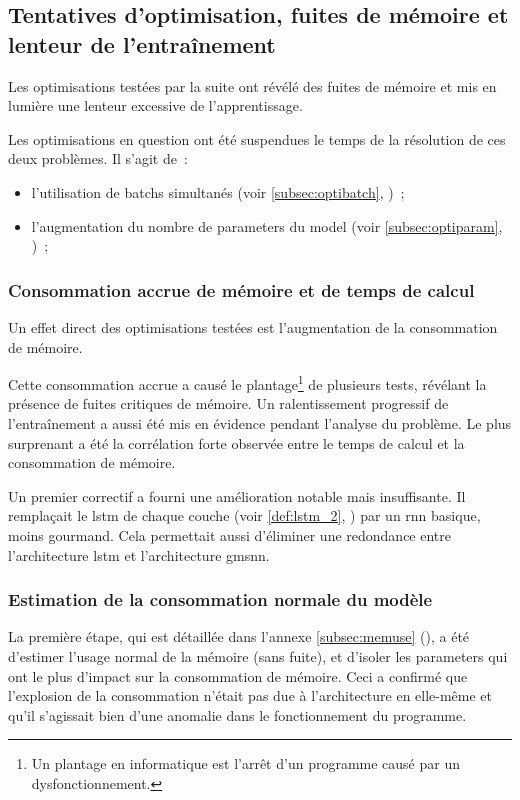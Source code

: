 \subsection{Tentatives d'optimisation, fuites de mémoire et lenteur de l'entraînement}\label{subsec:optimem}

Les optimisations testées par la suite ont révélé des fuites de mémoire et mis en lumière une lenteur excessive de l'apprentissage.

Les optimisations en question ont été suspendues le temps de la résolution de ces deux problèmes.
Il s'agit de~:
\begin{itemize}
	\item l'utilisation de \glspl{batch} simultanés (voir \autoref{subsec:optibatch}, )~; 
	\item l'augmentation du nombre de \glspl{parameter} du \gls{model} (voir \autoref{subsec:optiparam}, )~;
\end{itemize}

\subsubsection{Consommation accrue de mémoire et de temps de calcul}
Un effet direct des optimisations testées est l'augmentation de la consommation de mémoire.

Cette consommation accrue a causé le plantage\footnote{Un plantage en informatique est l'arrêt d'un programme causé par un dysfonctionnement.} de plusieurs tests, révélant la présence de fuites critiques de mémoire.
Un ralentissement progressif de l'entraînement a aussi été mis en évidence pendant l'analyse du problème.
Le plus surprenant a été la corrélation forte observée entre le temps de calcul et la consommation de mémoire.

Un premier correctif a fourni une amélioration notable mais insuffisante.
Il remplaçait le \gls{lstm} de chaque couche (voir \autoref{def:lstm_2}, ) par un \gls{rnn} basique, moins gourmand. Cela permettait aussi d'éliminer une redondance entre l'architecture \gls{lstm} et l'architecture \gls{gmsnn}.

\subsubsection{Estimation de la consommation normale du modèle}
La première étape, qui est détaillée dans l'annexe \ref{subsec:memuse} (), a été d'estimer l'usage normal de la mémoire (sans fuite), et d'isoler les \glspl{parameter} qui ont le plus d'impact sur la consommation de mémoire.
Ceci a confirmé que l'explosion de la consommation n'était pas due à l'architecture en elle-même et qu'il s'agissait bien d'une anomalie dans le fonctionnement du programme.

